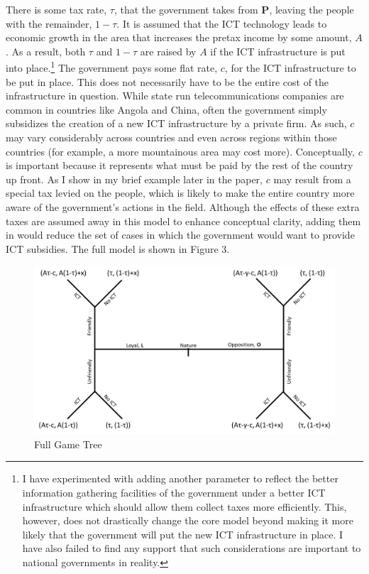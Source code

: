 \documentclass[12pt]{article}
\begin{document}
	There is some tax rate, $\tau$, that the government takes from \textbf{P}, leaving the people with the remainder, $1-\tau$. It is assumed that the ICT technology leads to economic growth in the area that increases the pretax income by some amount, $A$. As a result, both $\tau$ and $1-\tau$ are raised by $A$ if the ICT infrastructure is put into place.\footnote{I have experimented with adding another parameter to reflect the better information gathering facilities of the government under a better ICT infrastructure which should allow them collect taxes more efficiently. This, however, does not drastically change the core model beyond making it more likely that the government will put the new ICT infrastructure in place. I have also failed to find any support that such considerations are important to national governments in reality.} The government pays some flat rate, $c$, for the ICT infrastructure to be put in place. This does not necessarily have to be the entire cost of the infrastructure in question. While state run telecommunications companies are common in countries like Angola and China, often the government simply subsidizes the creation of a new ICT infrastructure by a private firm. As such, $c$ may vary considerably across countries and even across regions within those countries (for example, a more mountainous area may cost more). Conceptually, $c$ is important because it represents what must be paid by the rest of the country up front. As I show in my brief example later in the paper, $c$ may result from a special tax levied on the people, which is likely to make the entire country more aware of the government's actions in the field. Although the effects of these extra taxes are assumed away in this model to enhance conceptual clarity, adding them in would reduce the set of cases in which the government would want to provide ICT subsidies. The full model is shown in Figure 3.
	
	\begin{figure}[H]
		\centering
		\includegraphics[width=0.7\linewidth]{"Game Tree"}
		\caption{Full Game Tree}
		\label{fig:game-tree}
	\end{figure}
\end{document}
